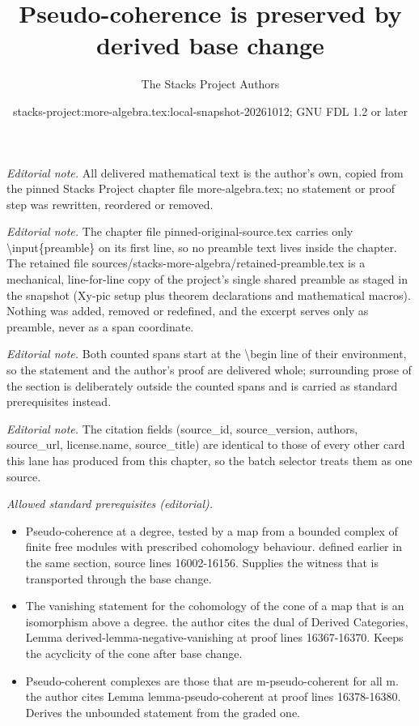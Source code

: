 \documentclass[10pt,a4paper]{amsart}
\title{Pseudo-coherence is preserved by derived base change}
\author{The Stacks Project Authors}
\date{stacks-project:more-algebra.tex:local-snapshot-20261012; GNU FDL 1.2 or later}
\theoremstyle{plain}
\theoremstyle{definition}
\theoremstyle{remark}
\numberwithin{equation}{subsection}
\begin{document}
\maketitle
\setcounter{subsection}{1}
\noindent\textit{Editorial note.} All delivered mathematical text is the author's own, copied from the pinned Stacks Project chapter file more-algebra.tex; no statement or proof step was rewritten, reordered or removed.\par\medskip
\noindent\textit{Editorial note.} The chapter file pinned-original-source.tex carries only \textbackslash{}input\{preamble\} on its first line, so no preamble text lives inside the chapter. The retained file sources/stacks-more-algebra/retained-preamble.tex is a mechanical, line-for-line copy of the project's single shared preamble as staged in the snapshot (Xy-pic setup plus theorem declarations and mathematical macros). Nothing was added, removed or redefined, and the excerpt serves only as preamble, never as a span coordinate.\par\medskip
\noindent\textit{Editorial note.} Both counted spans start at the \textbackslash{}begin line of their environment, so the statement and the author's proof are delivered whole; surrounding prose of the section is deliberately outside the counted spans and is carried as standard prerequisites instead.\par\medskip
\noindent\textit{Editorial note.} The citation fields (source\_id, source\_version, authors, source\_url, license.name, source\_title) are identical to those of every other card this lane has produced from this chapter, so the batch selector treats them as one source.\par\medskip
\noindent\textit{Allowed standard prerequisites (editorial).}\begin{itemize}
\item Pseudo-coherence at a degree, tested by a map from a bounded complex of finite free modules with prescribed cohomology behaviour. defined earlier in the same section, source lines 16002-16156. Supplies the witness that is transported through the base change.
\item The vanishing statement for the cohomology of the cone of a map that is an isomorphism above a degree. the author cites the dual of Derived Categories, Lemma derived-lemma-negative-vanishing at proof lines 16367-16370. Keeps the acyclicity of the cone after base change.
\item Pseudo-coherent complexes are those that are m-pseudo-coherent for all m. the author cites Lemma lemma-pseudo-coherent at proof lines 16378-16380. Derives the unbounded statement from the graded one.
\end{itemize}\medskip
\end{document}
